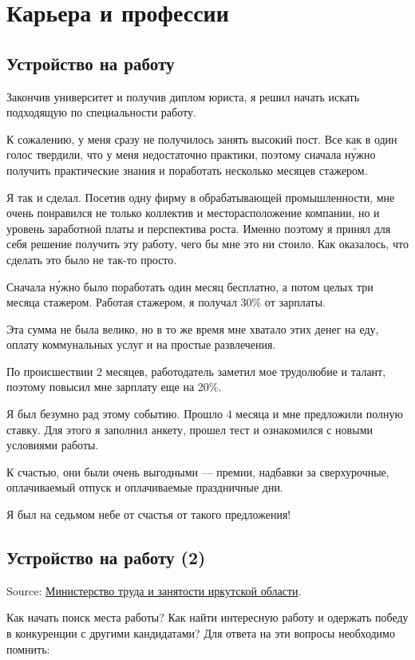 \chapter{Карьера и профессии}

\section{Устройство на работу}
Закончив университет и получив диплом юриста, я решил начать искать подходящую по специальности работу.

К сожалению, у меня сразу не получилось занять высокий пост.
Все как в один голос твердили, что у меня недостаточно практики, поэтому сначала н\'{у}жно получить практические знания и поработать несколько месяцев стажером.

Я так и сделал.
Посетив одну фирму в обрабатывающей промышленности, мне очень понравился не только коллектив и месторасположение компании, но и уровень заработной платы и перспектива роста.
Именно поэтому я принял для себя решение получить эту работу, чего бы мне это ни стоило.
Как оказалось, что сделать это было не так-то просто.

Сначала н\'{у}жно было поработать один месяц бесплатно, а потом целых три месяца стажером.
Работая стажером, я получал 30\% от зарплаты.

Эта сумма не была велико, но в то же время мне хватало этих денег на еду, оплату коммунальных услуг и на простые развлечения.

По происшествии 2 месяцев, работодатель заметил мое трудолюбие и талант, поэтому повысил мне зарплату еще на 20\%.

Я был безумно рад этому событию. Прошло 4 месяца и мне предложили полную ставку.
Для этого я заполнил анкету, прошел тест и ознакомился с новыми условиями работы.

К счастью, они были очень выгодными --- премии, надбавки за сверхурочные, оплачиваемый отпуск и оплачиваемые праздничные дни.

Я был на седьмом небе от счастья от такого предложения!

\section{Устройство на работу (2)}
Source: \href{http://irkzan.ru/home/gragd/soiskatel/soiskatelrabota.aspx}{Министерство труда и занятости иркутской области}.

Как начать поиск  места работы? Как найти интересную работу и одержать победу в конкуренции с другими кандидатами? Для ответа на эти вопросы необходимо помнить:


